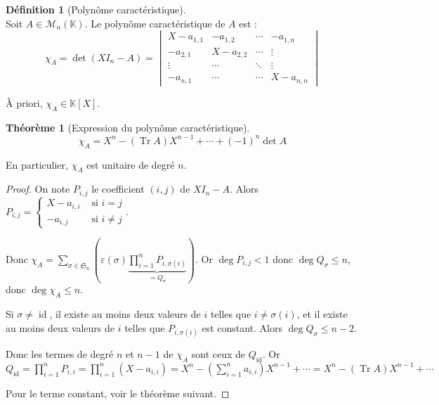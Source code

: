 \documentclass[12pt]{book}
\let\ensembleNombre\mathbb
\newcommand*\K{\ensuremath{\ensembleNombre{K}}}
\DeclareMathOperator{\id}{id}
\DeclareMathOperator{\Tr}{Tr}
\theoremstyle{definition}
\newtheorem*{defi}{Définition}
\newtheorem{thme}{Théorème}[chapter]
\theoremstyle{remark}
\newenvironment{fdef}
  {\begin{mdframed}[roundcorner=10pt, linewidth=1pt]\begin{defi}}
  {\end{defi}\end{mdframed}}
\newenvironment{fthme}
  {\begin{mdframed}[roundcorner=10pt, linewidth=2pt]\begin{thme}}
  {\end{thme}\end{mdframed}}
\begin{document}
	\begin{fdef}[Polynôme caractéristique] \mbox{~}\\
	Soit $A \in \mathcal M_n(\K)$. Le polynôme caractéristique de $A$ est :	
	\[
	\boxed{\chi_A = \det(XI_n - A)} = \begin{vmatrix}
										X - a_{1,1} & -a_{1,2} & \cdots & -a_{1,n} \\
										-a_{2,1} & X - a_{2,2} & \cdots & \vdots \\
										\vdots   & \cdots      & \ddots & \vdots \\
										-a_{n,1} & \cdots      & \cdots & X - a_{n,n}
									  \end{vmatrix}
	\]
	
	À priori, $\chi_A \in \K[X]$.
	\end{fdef}
	
	\begin{fthme}[Expression du polynôme caractéristique] \mbox{~}\\
	\[\boxed{ \chi_A = X^n - (\Tr A)X^{n-1} + \cdots + (-1)^n \det A }\]
	
	En particulier, $\chi_A$ est unitaire de degré $n$.
	\end{fthme}
	\begin{proof}
	On note $P_{i,j}$ le coefficient $(i,j)$ de $XI_n - A$. Alors $P_{i,j} = \begin{cases}
	X - a_{i,i} & \text{ si } i = j \\
	-a_{i,j} & \text{ si } i \neq j
	\end{cases}$.
	
	Donc $\chi_A = \sum_{\sigma \in \mathfrak S_n}\left( \varepsilon(\sigma) \underbrace{\prod_{i=1}^n P_{i, \sigma(i)}}_{= Q_{\sigma}}  \right)$. Or $\deg P_{i,j} < 1$ donc $\deg Q_\sigma \leq n$, donc $\deg \chi_A \leq n$.
	
	Si $\sigma \neq \id$, il existe au moins deux valeurs de $i$ telles que $i \neq \sigma(i)$, et il existe au moins deux valeurs de $i$ telles que $P_{i, \sigma(i)}$ est constant. Alors $\deg Q_\sigma \leq n-2$.
	
	Donc les termes de degré $n$ et $n-1$ de $\chi_A$ sont ceux de $Q_{\id}$. Or $Q_{\id} = \prod_{i=1}^n P_{i,i} = \prod_{i=1}^n (X - a_{i,i}) = X^n - \left( \sum_{i=1}^n a_{i,i} \right) X^{n-1} + \cdots = X^n - (\Tr A)X^{n-1} + \cdots$
	
	Pour le terme constant, voir le théorème suivant.
	\end{proof}
	
\end{document}
